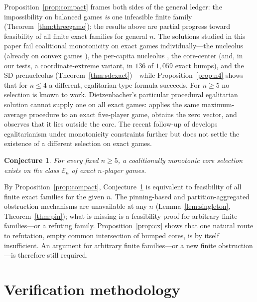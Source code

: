 \documentclass[11pt]{article}
\newtheorem{conjecture}[theorem]{Conjecture}
\begin{document}
Proposition~\ref{prop:compact} frames both sides of the general ledger: the
impossibility on balanced games \emph{is} one infeasible finite family
(Theorem~\ref{thm:threegame}); the results above are partial progress
toward feasibility of all finite exact families for general $n$. The
solutions studied in this paper fail coalitional monotonicity on exact
games individually---the nucleolus (already on convex games
\citep{Hokari2000}), the per-capita nucleolus \citep{Arin2013}, the
core-center \citep{MirasCalvo2021} (and, in our tests, a coordinate-extreme
variant, in $136$ of $1{,}059$ exact bumps), and the SD-prenucleolus
(Theorem~\ref{thm:sdexact})---while Proposition~\ref{prop:n4} shows that
for $n\le4$ a different, egalitarian-type formula succeeds. For $n\ge5$ no
selection is known to work. Dietzenbacher's particular procedural
egalitarian solution cannot supply one on all exact games:
\citet[][Example~5]{Mauri2017} applies the same maximum-average procedure to
an exact five-player game, obtains the zero vector, and observes that it lies
outside the core. The recent follow-up of \citet{DietzDogan2025} develops
egalitarianism under monotonicity constraints further but does not settle the
existence of a different selection on exact games.

\begin{conjecture}\label{conj:existence}
For every fixed $n\ge5$, a coalitionally monotonic core selection exists on
the class $\mathcal{E}_n$ of exact $n$-player games.
\end{conjecture}

By Proposition~\ref{prop:compact}, Conjecture~\ref{conj:existence} is
equivalent to feasibility of all finite exact families for the given $n$.
The pinning-based and partition-aggregated obstruction mechanisms are
unavailable at any $n$ (Lemma~\ref{lem:singleton}, Theorem~\ref{thm:pin});
what is missing is a
feasibility proof for arbitrary finite families---or a refuting family.
Proposition~\ref{prop:cx} shows that one natural route to refutation, empty
common intersection of bumped cores, is by itself insufficient. An
argument for arbitrary finite families---or a new finite obstruction---is
therefore still required.

\section{Verification methodology}\label{sec:methods}
\end{document}
